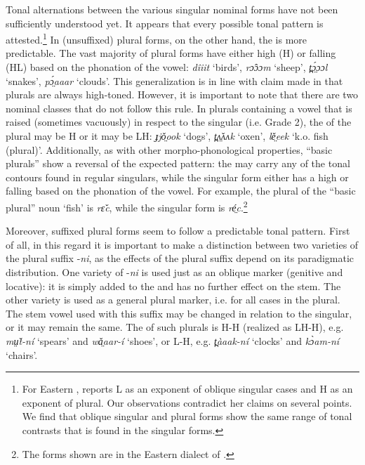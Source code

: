 \documentclass[output=paper,newtxmath,modfonts,nonflat]{langsci/langscibook}
\begin{document}
Tonal alternations between the various singular nominal forms have not been sufficiently understood yet. It appears that every possible tonal pattern is attested.\footnote{For Eastern , \citet{gjersøe2017} reports L  as an exponent of oblique singular cases and H  as an exponent of  plural. Our observations contradict her claims on several points. We find that oblique singular and  plural forms show the same range of tonal contrasts that is found in the  singular forms.}  In (unsuffixed) plural forms, on the other hand, the  is more predictable. The vast majority of plural forms have either high (H) or falling (HL)  based on the phonation of the vowel: \textit{dîiit} ‘birds’, \textit{rɔ̂ɔɔm} ‘sheep’, \textit{t̪ɔ̤́ɔɔl} ‘snakes’, \textit{pɔ̤́aaar} ‘clouds’. This generalization is in line with claim made in \citet{gjersøe2017} that plurals are always high-toned. However, it is important to note that there are two nominal classes that do not follow this rule. In plurals containing a vowel that is raised (sometimes vacuously) in respect to the singular (i.e. Grade 2), the  of the plural may be H or it may be LH: \textit{ɟjǒ̤ook} ‘dogs’, \textit{t̪ʌ̤̌ʌʌk} ‘oxen’, \textit{lě̤eek} ‘k.o. fish (plural)’. Additionally, as with other morpho-phonological properties, “basic plurals” show a reversal of the expected pattern: the  may carry any of the tonal contours found in regular singulars, while the singular form either has a high or falling  based on the phonation of the vowel. For example, the plural of the “basic plural” noun ‘fish’ is \textit{rɛ̌c}, while the singular form is \textit{ré̤c}.\footnote{The forms shown are in the Eastern dialect of .}

Moreover, suffixed plural forms seem to follow a predictable tonal pattern. First of all, in this regard it is important to make a distinction between two varieties of the plural suffix -\textit{ni}, as the effects of the plural suffix depend on its paradigmatic distribution. One variety of -\textit{ni} is used just as an oblique marker (genitive and locative): it is simply added to the   and has no further effect on the stem. The other variety is used as a general plural marker, i.e. for all cases in the plural. The stem vowel used with this suffix may be changed in relation to the  singular, or it may remain the same. The  of such plurals is H-H (realized as LH-H), e.g. \textit{mṳ̌t-ní} ‘spears’ and \textit{wǎ̤aar-í} ‘shoes’, or L-H, e.g. \textit{t̪àaak-ní} ‘clocks’ and \textit{kɔ̀am-ní} ‘chairs’.
\end{document}
